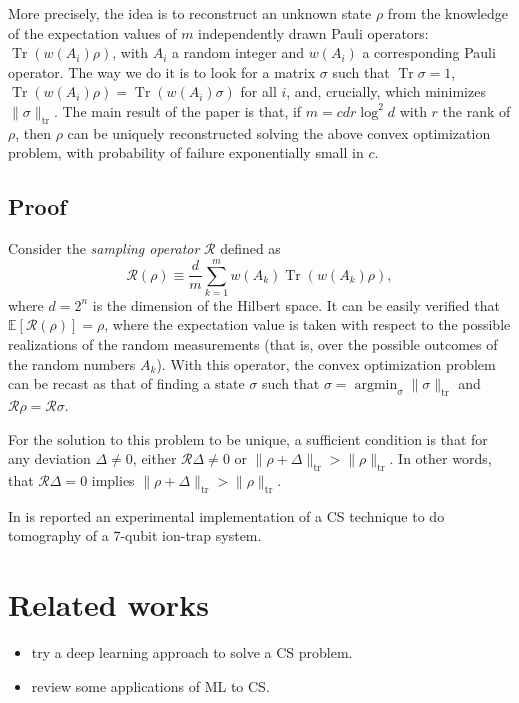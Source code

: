 \documentclass[a4paper, twocolumn]{article}
\newcommand{\on}[1]{{\operatorname{#1}}}
\DeclareMathOperator*{\argmin}{argmin}
\DeclareMathOperator{\Tr}{Tr}
\begin{document}
More precisely, the idea is to reconstruct an unknown state $\rho$ from the knowledge of the expectation values of $m$ independently drawn Pauli operators: $\Tr(w(A_i)\rho)$,
with $A_i$ a random integer and $w(A_i)$ a corresponding Pauli operator.
The way we do it is to look for a matrix $\sigma$ such that $\Tr\sigma=1$,
$\Tr(w(A_i)\rho)=\Tr(w(A_i)\sigma)$ for all $i$,
and, crucially, which minimizes $\|\sigma\|_{\on{tr}}$.
The main result of the paper is that, if $m=cdr\log^2 d$ with $r$ the rank of $\rho$,
then $\rho$ can be uniquely reconstructed solving the above convex optimization problem, with probability of failure exponentially small in $c$.

\subsection{Proof}
Consider the \textit{sampling operator} $\mathcal R$ defined as
\begin{equation}
	\mathcal R(\rho)\equiv \frac{d}{m}\sum_{k=1}^m w(A_k) \Tr(w(A_k)\rho),
\end{equation}
where $d=2^n$ is the dimension of the Hilbert space.
It can be easily verified that $\mathbb E[\mathcal R(\rho)] = \rho$,
where the expectation value is taken with respect to the possible realizations of the random measurements (that is, over the possible outcomes of the random numbers $A_k$).
With this operator, the convex optimization problem can be recast as that of finding a state $\sigma$ such that $\sigma=\argmin_\sigma\|\sigma\|_{\on{tr}}$ and $\mathcal R\rho=\mathcal R\sigma$.

For the solution to this problem to be unique, a sufficient condition is that for any deviation $\Delta\neq0$, either $\mathcal R\Delta\neq0$ or $\|\rho+\Delta\|_{\on{tr}}>\|\rho\|_{\on{tr}}$.
In other words, that $\mathcal R\Delta=0$ implies $\|\rho+\Delta\|_{\on{tr}}>\|\rho\|_{\on{tr}}$.

In \cite{riofrio2016experimental} is reported an experimental implementation of a CS technique to do tomography of a 7-qubit ion-trap system.

\section{Related works}
\begin{itemize}
\item \cite{palangi2016distributed} try a deep learning approach to solve a CS problem.
\item \cite{schneider2016deep} review some applications of ML to CS.
\end{itemize}

\printbibliography
\end{document}
